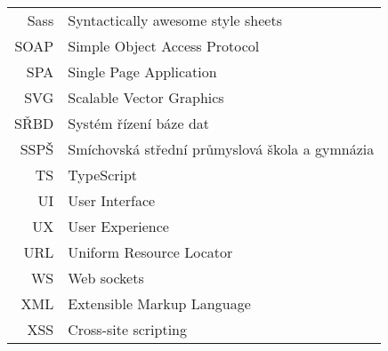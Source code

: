 \begin{longtable}{rl}
Sass & Syntactically awesome style sheets\\
SOAP & Simple Object Access Protocol\\
SPA & Single Page Application\\
SVG & Scalable Vector Graphics\\
SŘBD & Systém řízení báze dat\\
SSPŠ & Smíchovská střední průmyslová škola a gymnázia\\
TS & TypeScript\\
UI & User Interface\\
UX & User Experience\\
URL & Uniform Resource Locator\\
WS & Web sockets\\
XML & Extensible Markup Language\\
XSS & Cross-site scripting
\end{longtable}